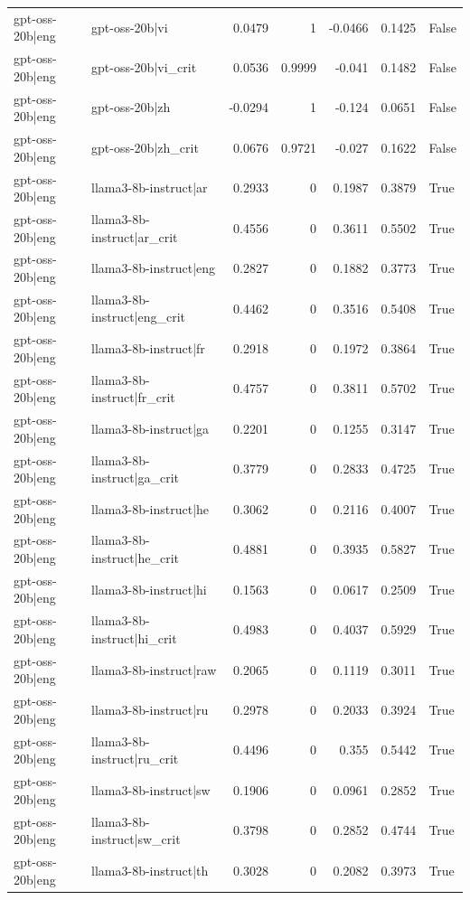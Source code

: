 \begin{table}
\begin{tabular}{l l r r r r l}
gpt-oss-20b|eng & gpt-oss-20b|vi & 0.0479 & 1 & -0.0466 & 0.1425 & False \\
gpt-oss-20b|eng & gpt-oss-20b|vi_crit & 0.0536 & 0.9999 & -0.041 & 0.1482 & False \\
gpt-oss-20b|eng & gpt-oss-20b|zh & -0.0294 & 1 & -0.124 & 0.0651 & False \\
gpt-oss-20b|eng & gpt-oss-20b|zh_crit & 0.0676 & 0.9721 & -0.027 & 0.1622 & False \\
gpt-oss-20b|eng & llama3-8b-instruct|ar & 0.2933 & 0 & 0.1987 & 0.3879 & True \\
gpt-oss-20b|eng & llama3-8b-instruct|ar_crit & 0.4556 & 0 & 0.3611 & 0.5502 & True \\
gpt-oss-20b|eng & llama3-8b-instruct|eng & 0.2827 & 0 & 0.1882 & 0.3773 & True \\
gpt-oss-20b|eng & llama3-8b-instruct|eng_crit & 0.4462 & 0 & 0.3516 & 0.5408 & True \\
gpt-oss-20b|eng & llama3-8b-instruct|fr & 0.2918 & 0 & 0.1972 & 0.3864 & True \\
gpt-oss-20b|eng & llama3-8b-instruct|fr_crit & 0.4757 & 0 & 0.3811 & 0.5702 & True \\
gpt-oss-20b|eng & llama3-8b-instruct|ga & 0.2201 & 0 & 0.1255 & 0.3147 & True \\
gpt-oss-20b|eng & llama3-8b-instruct|ga_crit & 0.3779 & 0 & 0.2833 & 0.4725 & True \\
gpt-oss-20b|eng & llama3-8b-instruct|he & 0.3062 & 0 & 0.2116 & 0.4007 & True \\
gpt-oss-20b|eng & llama3-8b-instruct|he_crit & 0.4881 & 0 & 0.3935 & 0.5827 & True \\
gpt-oss-20b|eng & llama3-8b-instruct|hi & 0.1563 & 0 & 0.0617 & 0.2509 & True \\
gpt-oss-20b|eng & llama3-8b-instruct|hi_crit & 0.4983 & 0 & 0.4037 & 0.5929 & True \\
gpt-oss-20b|eng & llama3-8b-instruct|raw & 0.2065 & 0 & 0.1119 & 0.3011 & True \\
gpt-oss-20b|eng & llama3-8b-instruct|ru & 0.2978 & 0 & 0.2033 & 0.3924 & True \\
gpt-oss-20b|eng & llama3-8b-instruct|ru_crit & 0.4496 & 0 & 0.355 & 0.5442 & True \\
gpt-oss-20b|eng & llama3-8b-instruct|sw & 0.1906 & 0 & 0.0961 & 0.2852 & True \\
gpt-oss-20b|eng & llama3-8b-instruct|sw_crit & 0.3798 & 0 & 0.2852 & 0.4744 & True \\
gpt-oss-20b|eng & llama3-8b-instruct|th & 0.3028 & 0 & 0.2082 & 0.3973 & True \\

\end{tabular}
\end{table}

